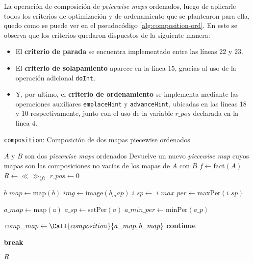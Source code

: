 La operación de composición de \textit{peicewise maps} ordenados, luego de aplicarle todos los criterios de optimización y de ordenamiento que se plantearon para ella, quedo como se puede ver en el pseudocódigo \ref{alg:composition-ord}. En este se observa que los criterios quedaron dispuestos de la siguiente manera:

\begin{itemize}
    \item El \textbf{criterio de parada} se encuentra implementado entre las líneas 22 y 23.
    
    \item El \textbf{criterio de solapamiento} aparece en la línea 15, gracias al uso de la operación adicional \texttt{doInt}.
    
    \item Y, por ultimo, el \textbf{criterio de ordenamiento} se implementa mediante las operaciones auxiliares \texttt{emplaceHint} y \texttt{advanceHint}, ubicadas en las líneas 18 y 10 respectivamente, junto con el uso de la variable $r\_pos$ declarada en la línea 4.
\end{itemize}




\begin{algorithm}
\caption{\texttt{composition}: Composición de dos mapas piecewise ordenados}
\label{alg:composition-ord}
\begin{algorithmic}[1]
\Require $A$ y $B$ son dos \textit{piecewise maps} ordenados
\Ensure Devuelve un nuevo \textit{piecewise map} cuyos mapas son las composiciones no vacías de los mapas de $A$ con $B$
    \State $f \gets \mathrm{fact}(A)$
    \State $R \gets \ll\gg_{\langle f \rangle}$   
    \State $r\_pos \gets 0$

        \State $b\_map \gets \mathrm{map}(b)$
        \State $img \gets \mathrm{image}(b_map)$
        \State $i\_sp \gets$ 
        \State $i\_max\_per \gets \mathrm{maxPer}(i\_sp)$

        \State {}

            \State $a\_map \gets \mathrm{map}(a)$
            \State $a\_sp \gets \mathrm{setPer}(a)$
            \State $a\_min\_per \gets \mathrm{minPer}(a\_p)$



                \State $comp\_map \gets \Call{composition}{a\_map,b\_map}$
                    \State {}
                \EndIf
                \State \textbf{continue}
            \EndIf

                \State \textbf{break}
            \EndIf
        \EndFor
    \EndFor

    \State \Return $R$
\EndFunction
\end{algorithmic}
\end{algorithm}





